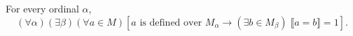 For every ordinal $\alpha$,
$$(\forall \alpha)(\exists \beta)(\forall a \in M)[a \text{ is defined over } M_{\alpha} \to (\exists b \in M_{\beta})\; \llbracket a = b \rrbracket = 1].$$
